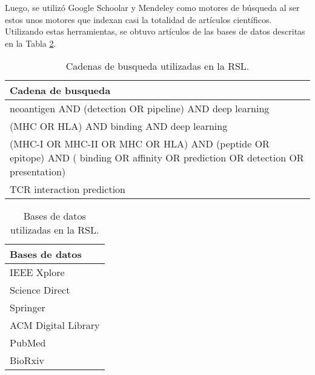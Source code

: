 Luego, se utilizó Google Schoolar y Mendeley como motores de búsqueda al ser estos unos motores que indexan casi la totalidad de artículos científicos. Utilizando estas herramientas, se obtuvo artículos de las bases de datos descritas en la Tabla \ref{tab:bd_RSL}.




\begin{table}[H]
	\begin{center}
		\caption{Cadenas de busqueda utilizadas en la RSL.}
		\label{tab:key_words}
		\setlength{\tabcolsep}{0.5em} %
		{\renewcommand{\arraystretch}{1.4}%
				\begin{tabular}{p{14cm}}
				\textbf{Cadena de busqueda} \\ \hline
				neoantigen  AND (detection OR pipeline) AND deep learning                                                                               \\
				(MHC OR HLA) AND binding  AND deep learning                                                                                             \\				
				(MHC-I OR MHC-II OR MHC OR HLA) AND (peptide OR epitope) AND ( binding OR affinity OR prediction OR detection OR presentation)          \\
				TCR interaction prediction                                                                                                              \\		
			\end{tabular}
		}
	\end{center}
\end{table}

\begin{table}[H]
	\begin{center}
		\caption{Bases de datos utilizadas en la RSL.}
		\label{tab:bd_RSL}
		\setlength{\tabcolsep}{0.5em} %
		{\renewcommand{\arraystretch}{1.2}%
			\begin{tabular}{p{14cm}}
				\textbf{Bases de datos} \\ \hline
				IEEE Xplore                                                                               \\
				Science Direct \\				
				Springer          \\
				ACM Digital Library                                                                                                             \\	
				PubMed \\ 
				BioRxiv \\ 	
			\end{tabular}
		}
	\end{center}
\end{table}

